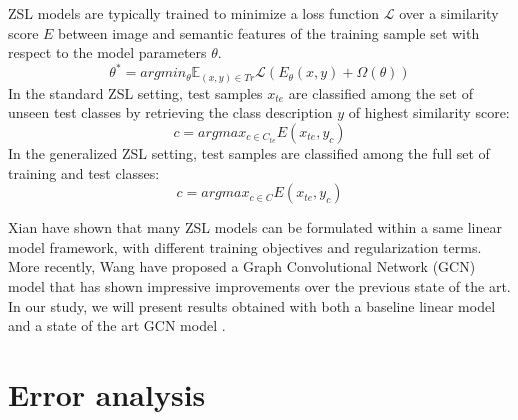 ZSL models are typically trained to minimize a loss function $\mathcal{L}$ over a similarity score $E$ between image and semantic features of the training sample set with respect to the model parameters $\theta$.  
\begin{equation} 
\theta^{*} = argmin_{\theta} \mathbb{E}_{(x,y) \in Tr}\mathcal{L}(E_{\theta}(x,y) + \Omega(\theta))
\end{equation} 
In the standard ZSL setting, test samples $x_{te}$ are classified among the set of unseen test classes by retrieving the class description $y$ of highest similarity score:
\begin{equation} 
c = argmax_{c \in C_{te}}E(x_{te}, y_c)
\end{equation} 
In the generalized ZSL setting, test samples are classified among the full set of training and test classes:
\begin{equation} 
c = argmax_{c \in C}E(x_{te}, y_c)
\end{equation} 

Xian \etal \cite{xian2016latent} have shown that many ZSL models can be formulated within a same linear model framework, 
with different training objectives and regularization terms.
More recently, Wang \etal \cite{wang2018zero} have proposed a Graph Convolutional Network (GCN) 
model that has shown impressive improvements over the previous state of the art.
In our study, we will present results obtained with both a baseline linear model \cite{romera2015embarrassingly} 
and a state of the art GCN model \cite{wang2018zero,kampffmeyer2018rethinking}.

\section{Error analysis}

